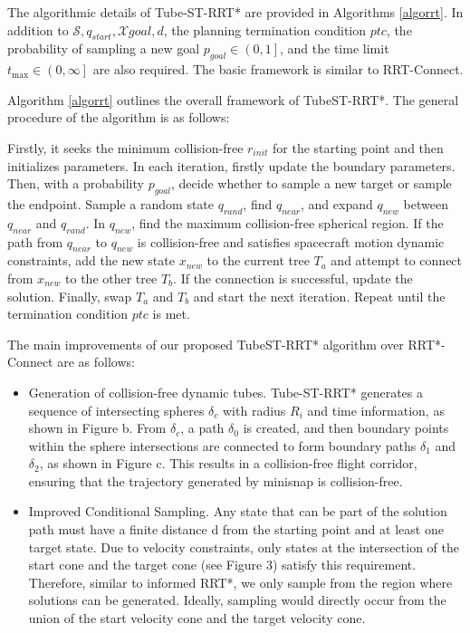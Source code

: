 \documentclass[conference]{IEEEtran}
\begin{document}
    The algorithmic details of Tube-ST-RRT* are provided in Algorithms \ref{algorrt}. In addition to $\mathcal{S}, q_{start}, \mathcal{X}{goal}, d$, the planning termination condition $ptc$, the probability of sampling a new goal $p_{goal} \in \left (0, 1 \right ]$, and the time limit $t_{\max} \in \left (0, \infty \right]$ are also required. The basic framework is similar to RRT-Connect.

    Algorithm \ref{algorrt} outlines the overall framework of TubeST-RRT*. The general procedure of the algorithm is as follows:

    Firstly, it seeks the minimum collision-free $r_{init}$ for the starting point and then initializes parameters.
    In each iteration, firstly update the boundary parameters. Then, with a probability $p_{goal}$, decide whether to sample a new target or sample the endpoint. Sample a random state $q_{rand}$, find $q_{near}$, and expand $q_{new}$ between $q_{near}$ and $q_{rand}$. In $q_{new}$, find the maximum collision-free spherical region. If the path from $q_{near}$ to $q_{new}$ is collision-free and satisfies spacecraft motion dynamic constraints, add the new state $x_{new}$ to the current tree $T_{a}$ and attempt to connect from $x_{new}$ to the other tree $T_{b}$. If the connection is successful, update the solution. Finally, swap $T_{a}$ and $T_{b}$ and start the next iteration. Repeat until the termination condition $ptc$ is met.

    The main improvements of our proposed TubeST-RRT* algorithm over RRT*-Connect are as follows:
    \begin{itemize}
        \item Generation of collision-free dynamic tubes. Tube-ST-RRT* generates a sequence of intersecting spheres $\delta_{c}$ with radius $R_i$ and time information, as shown in Figure b. From $\delta_{c}$, a path $\delta_{0}$ is created, and then boundary points within the sphere intersections are connected to form boundary paths $\delta_{1}$ and $\delta_{2}$, as shown in Figure c. This results in a collision-free flight corridor, ensuring that the trajectory generated by minisnap is collision-free.
        \item Improved Conditional Sampling. Any state that can be part of the solution path must have a finite distance d from the starting point and at least one target state. Due to velocity constraints, only states at the intersection of the start cone and the target cone (see Figure 3) satisfy this requirement. Therefore, similar to informed RRT*, we only sample from the region where solutions can be generated. Ideally, sampling would directly occur from the union of the start velocity cone and the target velocity cone. 
    \end{itemize}
    
\end{document}
